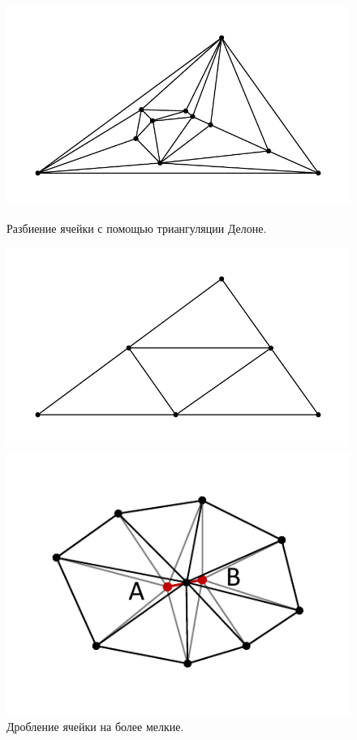 \documentclass[
11pt,%
tightenlines,%
twoside,%
onecolumn,%
nofloats,%
nobibnotes,%
nofootinbib,%
superscriptaddress,%
noshowpacs,%
centertags]%
{revtex4}
\begin{document}
\begin{figure}[h]
  \centering
  \begin{minipage}[h]{0.35\textwidth}
    \includegraphics[width=\textwidth]{pics/pic_delaunay_size.pdf}
    \caption{Разбиение ячейки с помощью триангуляции Делоне.}\label{fig:pic_delaunay}
  \end{minipage}
  \hfill
  \begin{minipage}[h]{0.35\textwidth}
    \includegraphics[width=\textwidth]{pics/pic_delaunay_2_size.pdf}
    \caption{Дробление ячейки на более мелкие.}\label{fig:pic_delaunay_2}
  \end{minipage}
  \hfill
  \begin{minipage}[h]{0.28\textwidth}
    \includegraphics[width=\textwidth]{pics/pic_reduce_edge_size.pdf}

\end{minipage}
\end{figure}
\end{document}
